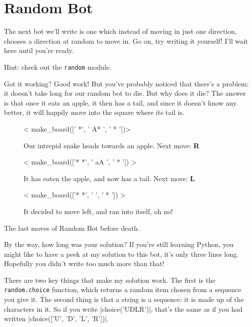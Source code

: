 
\section{Random Bot}

The next bot we’ll write is one which instead of moving in just one direction,
chooses a direction at random to move in.
Go on, try writing it yourself! I’ll wait here until you’re ready.

Hint: check out the \texttt{random} module.

Got it working? Good work!
But you’ve probably noticed that there’s a problem:
it doesn’t take long for our random bot to die.
But why does it die?
The answer is that once it eats an apple, it then has a tail, and since it
doesn’t know any better, it will happily move into the square where its tail is.

\begin{board}
\hfill
%
\begin{subfigure}{.3\linewidth}
< make_board(['   *', ' A* ', ' *  '])>
\caption{Our intrepid snake heads towards an apple. Next move: \textbf{R}}
\label{brd:random-death:1}
\end{subfigure}
\hfill
%
\begin{subfigure}{.3\linewidth}
< make_board(['*  *', ' aA ', ' *  ']) >
\caption{It has eaten the apple, and now has a tail. Next move: \textbf{L}}
\label{brd:random-death:2}
\end{subfigure}
\hfill
%
\begin{subfigure}{.3\linewidth}
< make_board(['*  *', '    ', ' *  ']) >
\caption{It decided to move left, and ran into itself, oh no!}
\label{brd:random-death:3}
\end{subfigure}
%
\hfill

\caption{The last moves of Random Bot before death.}
\label{brd:random-death}
\end{board}

\ifshowcode

\pagebreak

By the way, how long was your solution?
If you’re still learning Python, you might like to have a peek at my solution to
this bot, it’s only three lines long.
Hopefully you didn’t write too much more than that!


There are two key things that make my solution work.
The first is the \texttt{random.choice} function,
which returns a random item chosen from a sequence you give it.
The second thing is that a string is a sequence:
it is made up of the characters in it.
So if you write |choice('UDLR')|,
that’s the same as if you had written
|choice(['U', 'D', 'L', 'R'])|.

\fi
